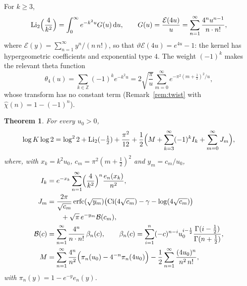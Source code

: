 \documentclass[11pt,reqno]{amsart}
\newtheorem{theorem}{Theorem}[section]
\theoremstyle{definition}
\theoremstyle{remark}
\newcommand{\erfc}{\operatorname{erfc}}
\newcommand{\Ci}{\operatorname{Ci}}
\newcommand{\Eip}{\mathcal{E}}
\newcommand{\Li}{\operatorname{Li}}
\newcommand{\dd}{\,\mathrm{d}}
\newcommand{\ZZ}{\mathbb{Z}}
\begin{document}
For $k \ge 3$,
\[
  \Li_2\Bigl(\frac4{k^2}\Bigr) = \int_0^\infty e^{-k^2u} G(u)\dd u, \qquad
  G(u) = \frac{\Eip(4u)}{u} = \sum_{n=1}^{\infty}\frac{4^nu^{n-1}}{n\cdot n!},
\]
where $\Eip(y) = \sum_{n=1}^{\infty}y^n/(n\,n!)$, so that $\vartheta\Eip(4u) = e^{4u} - 1$: the kernel has hypergeometric
coefficients and exponential type $4$. The weight $(-1)^k$ makes the relevant theta function
\[
  \theta_4(u) = \sum_{k\in\ZZ}(-1)^ke^{-k^2u} = 2\sqrt{\frac{\pi}{u}}\sum_{m=0}^{\infty}e^{-\pi^2(m+\frac12)^2/u},
\]
whose transform has no constant term (Remark~\ref{rem:twist} with $\hat\chi(n) = 1 - (-1)^n$).

\begin{theorem}\label{thm:khinchin}
For every $u_0 > 0$,
\[
  \log K\log 2 = \log^2 2 + \Li_2(-\tfrac12) + \frac{\pi^2}{12} + \frac12\Bigl(M + \sum_{k=3}^{\infty}(-1)^kI_k + \sum_{m=0}^{\infty}J_m\Bigr),
\]
where, with $x_k = k^2u_0$, $c_m = \pi^2(m+\frac12)^2$ and $y_m = c_m/u_0$,
\begin{align*}
  I_k &= e^{-x_k}\sum_{n=1}^{\infty}\Bigl(\frac{4}{k^2}\Bigr)^n\frac{e_n(x_k)}{n^2}, \\
  J_m &= \frac{2\pi}{\sqrt{c_m}}\erfc(\sqrt{y_m})\bigl(\Ci(4\sqrt{c_m}) - \gamma - \log(4\sqrt{c_m})\bigr) \\
      &\qquad + \sqrt\pi\, e^{-y_m}\mathcal B(c_m), \\
  \mathcal B(c) &= \sum_{n=1}^{\infty}\frac{4^n}{n\cdot n!}\,\beta_n(c), \qquad
  \beta_n(c) = \sum_{i=1}^{n}(-c)^{n-i}u_0^{i-\frac12}\frac{\Gamma(i-\frac12)}{\Gamma(n+\frac12)}, \\
  M &= \sum_{n=1}^{\infty}\frac{4^n}{n^2}\Bigl(\pi_n(u_0) - 4^{-n}\pi_n(4u_0)\Bigr) - \frac12\sum_{n=1}^{\infty}\frac{(4u_0)^n}{n^2\,n!},
\end{align*}
with $\pi_n(y) = 1 - e^{-y}e_n(y)$.
\end{theorem}
\end{document}
